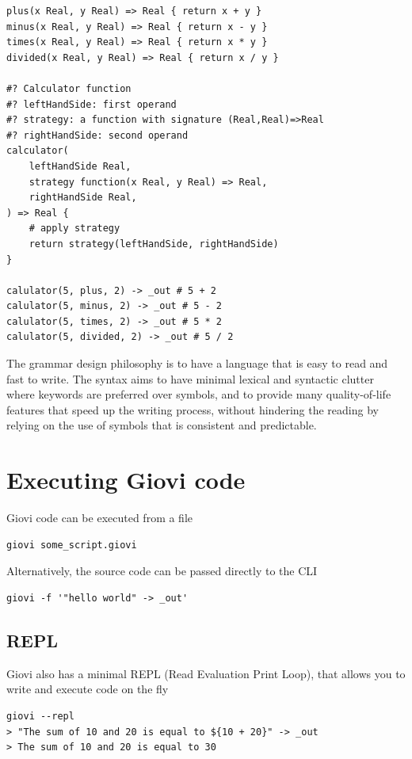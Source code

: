 \begin{listing}
	\label{lst:calculator}
	\caption{
		An example of a  function and the use of functions as
		first-class citizens
	}
	\begin{verbatim}
plus(x Real, y Real) => Real { return x + y }
minus(x Real, y Real) => Real { return x - y }
times(x Real, y Real) => Real { return x * y }
divided(x Real, y Real) => Real { return x / y }

#? Calculator function
#? leftHandSide: first operand
#? strategy: a function with signature (Real,Real)=>Real
#? rightHandSide: second operand
calculator(
	leftHandSide Real,
	strategy function(x Real, y Real) => Real,
	rightHandSide Real,
) => Real {
	# apply strategy
	return strategy(leftHandSide, rightHandSide)
}

calulator(5, plus, 2) -> _out # 5 + 2
calulator(5, minus, 2) -> _out # 5 - 2
calulator(5, times, 2) -> _out # 5 * 2
calulator(5, divided, 2) -> _out # 5 / 2
	\end{verbatim}
\end{listing}

The grammar design philosophy is to have a language that is easy to read and
fast to write. The syntax aims to have minimal lexical and syntactic clutter
where keywords are preferred over symbols, and to provide many quality-of-life
features that speed up the writing process, without hindering the reading by
relying on the use of symbols that is consistent and predictable.

\section{Executing Giovi code}

Giovi code can be executed from a file

\begin{verbatim}
giovi some_script.giovi
\end{verbatim}

Alternatively, the source code can be passed directly to the CLI

\begin{verbatim}
giovi -f '"hello world" -> _out'
\end{verbatim}

\subsection{REPL}

Giovi also has a minimal REPL (Read Evaluation Print Loop), that allows you to
write and execute code on the fly

\begin{verbatim}
giovi --repl
> "The sum of 10 and 20 is equal to ${10 + 20}" -> _out
> The sum of 10 and 20 is equal to 30
\end{verbatim}


